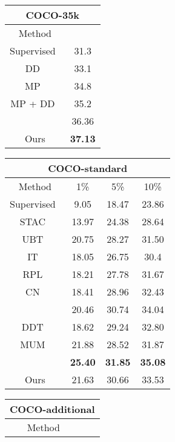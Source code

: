 \documentclass{bmvc2k}
\begin{document}
\begin{table}[h]
    \centering
    \scriptsize
    \begin{tabular}{c|c}
        \toprule
        \multicolumn{2}{c}{COCO-35k} \\
        \midrule
        Method &  \\
        \midrule
        Supervised~\cite{wang2021data} & 31.3 \\
        DD~\cite{wang2021data} & 33.1 \\
        MP~\cite{wang2021data} & 34.8 \\
        MP + DD~\cite{wang2021data} & 35.2 \\
         & 36.36 \\
        \midrule
        Ours & \textbf{37.13} \\
        \bottomrule
    \end{tabular}
    \qquad
    \begin{tabular}{c|c|c|c}
        \toprule
        \multicolumn{4}{c}{COCO-standard} \\
        \midrule
        Method &  1\% & 5\% & 10\% \\
        \midrule
        Supervised~\cite{liu2021unbiased} & 9.05 & 18.47 & 23.86 \\
        STAC~\cite{STAC} & 13.97 & 24.38 & 28.64 \\
        UBT~\cite{liu2021unbiased} & 20.75 & 28.27 & 31.50 \\
        IT~\cite{instant_teaching} & 18.05 & 26.75 & 30.4 \\
        RPL~\cite{rethink} & 18.21 & 27.78 & 31.67 \\ 
        CN~\cite{combatnoise} & 18.41 & 28.96 & 32.43 \\
        ~\cite{xu2021soft} & 20.46 & 30.74 & 34.04 \\
        DDT~\cite{zheng2022dual} & 18.62 & 29.24 & 32.80 \\
        MUM~\cite{MUM} & 21.88 & 28.52 & 31.87 \\
        ~\cite{ubteacherv2} & \textbf{25.40} & \textbf{31.85} & \textbf{35.08} \\
        \midrule
        Ours & 21.63 & 30.66 & 33.53 \\
        \bottomrule
    \end{tabular}
    \qquad
    \begin{tabular}{c|c}
        \toprule
        \multicolumn{2}{c}{COCO-additional} \\
        \midrule
        Method &   \\

\end{tabular}
\end{table}
\end{document}
